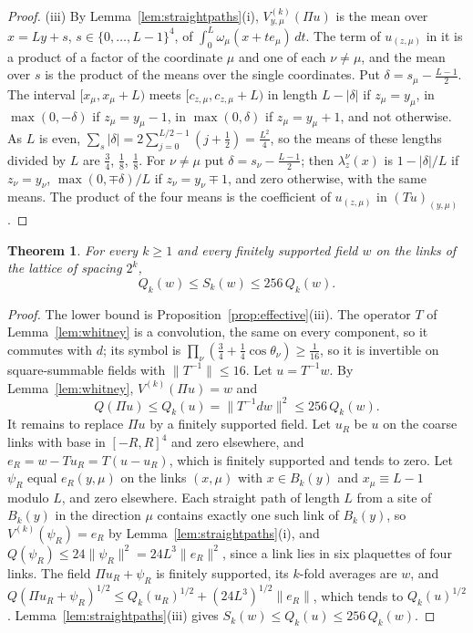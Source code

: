 \documentclass[11pt]{amsart}
\newtheorem{theorem}{Theorem}[section]
\theoremstyle{definition}
\theoremstyle{remark}
\numberwithin{equation}{section}
\begin{document}
\begin{proof}
(iii) By Lemma~\ref{lem:straightpaths}(i), $V^{(k)}_{y,\mu}(\Pi u)$ is the
mean over $x=Ly+s$, $s\in\{0,\dots,L-1\}^4$, of $\int_0^L\omega_\mu(x+te_\mu)
\,dt$. The term of $u_{(z,\mu)}$ in it is a product of a factor of the
coordinate $\mu$ and one of each $\nu\ne\mu$, and the mean over $s$ is the
product of the means over the single coordinates. Put $\delta=s_\mu-
\frac{L-1}2$. The interval $[x_\mu,x_\mu+L)$ meets $[c_{z,\mu},c_{z,\mu}+L)$
in length $L-|\delta|$ if $z_\mu=y_\mu$, in $\max(0,-\delta)$ if $z_\mu=
y_\mu-1$, in $\max(0,\delta)$ if $z_\mu=y_\mu+1$, and not otherwise. As $L$
is even, $\sum_s|\delta|=2\sum_{j=0}^{L/2-1}(j+\frac12)=\frac{L^2}4$, so the
means of these lengths divided by $L$ are $\frac34$, $\frac18$, $\frac18$.
For $\nu\ne\mu$ put $\delta=s_\nu-\frac{L-1}2$; then $\lambda^\nu_z(x)$ is
$1-|\delta|/L$ if $z_\nu=y_\nu$, $\max(0,\mp\delta)/L$ if $z_\nu=y_\nu\mp1$,
and zero otherwise, with the same means. The product of the four means is
the coefficient of $u_{(z,\mu)}$ in $(Tu)_{(y,\mu)}$.
\end{proof}

\begin{theorem}\label{thm:effectiveupper}
For every $k\ge1$ and every finitely supported field $w$ on the links of the
lattice of spacing $2^k$,
\[
Q_k(w)\le S_k(w)\le256\,Q_k(w).
\]
\end{theorem}

\begin{proof}
The lower bound is Proposition~\ref{prop:effective}(iii). The operator $T$
of Lemma~\ref{lem:whitney} is a convolution, the same on every component, so
it commutes with $d$; its symbol is $\prod_\nu(\frac34+\frac14\cos\theta_\nu)
\ge\frac1{16}$, so it is invertible on square-summable fields with
$\|T^{-1}\|\le16$. Let $u=T^{-1}w$. By Lemma~\ref{lem:whitney},
$V^{(k)}(\Pi u)=w$ and
\[
Q(\Pi u)\le Q_k(u)=\|T^{-1}dw\|^2\le256\,Q_k(w).
\]
It remains to replace $\Pi u$ by a finitely supported field. Let $u_R$ be
$u$ on the coarse links with base in $[-R,R]^4$ and zero elsewhere, and
$e_R=w-Tu_R=T(u-u_R)$, which is finitely supported and tends to zero.
Let $\psi_R$ equal $e_R(y,\mu)$ on the links $(x,\mu)$ with $x\in B_k(y)$
and $x_\mu\equiv L-1$ modulo $L$, and zero elsewhere. Each straight path of
length $L$ from a site of $B_k(y)$ in the direction $\mu$ contains exactly
one such link of $B_k(y)$, so $V^{(k)}(\psi_R)=e_R$ by
Lemma~\ref{lem:straightpaths}(i), and $Q(\psi_R)\le24\|\psi_R\|^2=24L^3
\|e_R\|^2$, since a link lies in six plaquettes of four links. The field
$\Pi u_R+\psi_R$ is finitely supported, its $k$-fold averages are $w$, and
$Q(\Pi u_R+\psi_R)^{1/2}\le Q_k(u_R)^{1/2}+(24L^3)^{1/2}\|e_R\|$, which
tends to $Q_k(u)^{1/2}$. Lemma~\ref{lem:straightpaths}(iii) gives
$S_k(w)\le Q_k(u)\le256\,Q_k(w)$.
\end{proof}
\end{document}
